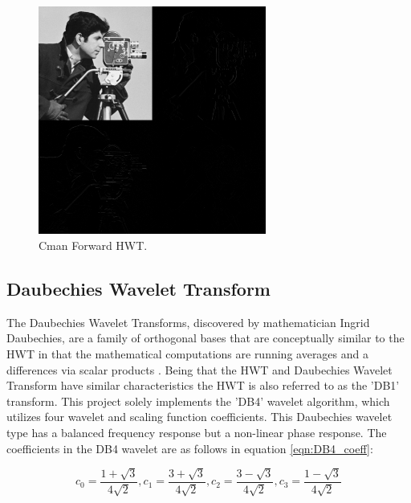 \documentclass{article}\raggedbottom
\begin{document}
\begin{figure}[H]
	\centering
	\includegraphics[width=75mm]{../../2_Software/data/cman_HWT.png}
	\caption{Cman Forward HWT.}
	\label{fig:HWT_cman}	
\end{figure}
 
\subsection{Daubechies Wavelet Transform}
The Daubechies Wavelet Transforms, discovered by mathematician Ingrid Daubechies, are a family of orthogonal bases that are conceptually similar to the HWT in that the mathematical computations are running averages and a differences via scalar products \cite{porwik2004haar}. Being that the HWT and Daubechies Wavelet Transform have similar characteristics the HWT is also referred to as the 'DB1' transform. This project solely implements the 'DB4' wavelet algorithm, which utilizes four wavelet and scaling function coefficients. This Daubechies wavelet type has a balanced frequency response but a non-linear phase response. The coefficients in the DB4 wavelet are as follows in equation \eqref{eqn:DB4_coeff}:

\begin{equation}
	c_{0}=\frac{1+\sqrt{3}}{4\sqrt{2}},
	c_{1}=\frac{3+\sqrt{3}}{4\sqrt{2}},
	c_{2}=\frac{3-\sqrt{3}}{4\sqrt{2}},
	c_{3}=\frac{1-\sqrt{3}}{4\sqrt{2}}
	\label{eqn:DB4_coeff}
\end{equation}
\end{document}
